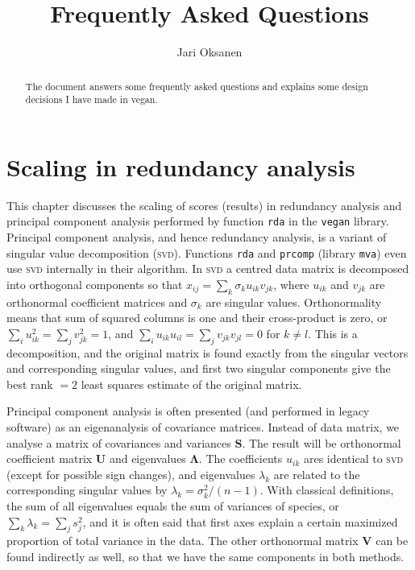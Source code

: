 \documentclass[a4paper]{article}
\author{Jari Oksanen}
\title{Frequently Asked Questions}
\begin{document}
\maketitle

\begin{abstract}

\noindent
The document answers some frequently asked questions and explains some
design decisions I have made in vegan.

\end{abstract}

\tableofcontents

\section{Scaling in redundancy analysis}

This chapter discusses the scaling of scores (results) in redundancy
analysis and principal component analysis performed by function
\texttt{rda} in the \texttt{vegan} library.  Principal component
analysis, and hence redundancy analysis, is a variant of singular
value decomposition (\textsc{svd}).  Functions \texttt{rda} and
\texttt{prcomp} (library \texttt{mva}) even use \textsc{svd}
internally in their algorithm.  In \textsc{svd} a centred data matrix
is decomposed into orthogonal components so that $x_{ij} = \sum_k
\sigma_k u_{ik} v_{jk}$, where $u_{ik}$ and $v_{jk}$ are orthonormal
coefficient matrices and $\sigma_k$ are singular values.
Orthonormality means that sum of squared columns is one and their
cross-product is zero, or $\sum_i u_{ik}^2 = \sum_j v_{jk}^2 = 1$, and
$\sum_i u_{ik} u_{il} = \sum_j v_{jk} v_{jl} = 0$ for $k \neq l$. This
is a decomposition, and the original matrix is found exactly from the
singular vectors and corresponding singular values, and first two
singular components give the best rank $=2$ least squares estimate of
the original matrix.

Principal component analysis is often presented (and performed in
legacy software) as an eigenanalysis of covariance matrices.  Instead
of data matrix, we analyse a matrix of covariances and variances
$\mathbf{S}$.  The result will be orthonormal coefficient matrix
$\mathbf{U}$ and eigenvalues $\mathbf{\Lambda}$.  The coefficients
$u_{ik}$ ares identical to \textsc{svd} (except for possible sign
changes), and eigenvalues $\lambda_k$ are related to the corresponding
singular values by $\lambda_k = \sigma_k^2 /(n-1)$.  With classical
definitions, the sum of all eigenvalues equals the sum of variances of
species, or $\sum_k \lambda_k = \sum_j s_j^2$, and it is often said
that first axes explain a certain maximized proportion of total
variance in the data.  The other orthonormal matrix $\mathbf{V}$ can
be found indirectly as well, so that we have the same components in
both methods.
\end{document}
